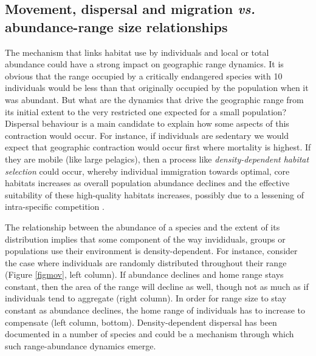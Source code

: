 \documentclass{article}
\begin{document}


\subsection{Movement, dispersal and migration \emph{vs.} abundance-range size relationships}

The mechanism that links habitat use by individuals and local or total
abundance could have a strong impact on geographic range dynamics. It is obvious that
the range occupied by a critically endangered
species with 10 individuals would be less than that originally
occupied by the population when it was abundant. But what
are the dynamics that drive the geographic range from its initial
extent to the very restricted one expected for a small population?
Dispersal behaviour is a main candidate to explain how some
aspects of this contraction would occur. For instance, if
individuals are sedentary we would expect that geographic contraction
would occur first where mortality is highest. If they are mobile (like
large pelagics), then a process like \emph{density-dependent habitat
selection} could occur, whereby individual immigration towards
optimal, core habitats increases as overall population abundance declines
and the effective suitability of these high-quality habitats
increases, possibly due to a lessening of intra-specific competition
\citep{MacCall1990_a}.

The relationship between the abundance of a species and the extent of
its distribution implies that some component of the way invididuals,
groups or populations use their environment is density-dependent. For
instance, consider the case where individuals are randomly distributed
throughout their range (Figure \ref{figmov}, left column). If abundance
declines and home range stays constant, then the area of the range
will decline as well, though not as much as if individuals tend to
aggregate (right column). In order for range size to stay constant
as abundance declines, the home range of individuals has to
increase to compensate (left column, bottom).  Density-dependent
dispersal has been documented in a number of species
\citep{Matthysen2005_a} and could be a mechanism through which such
range-abundance dynamics emerge.
\end{document}
